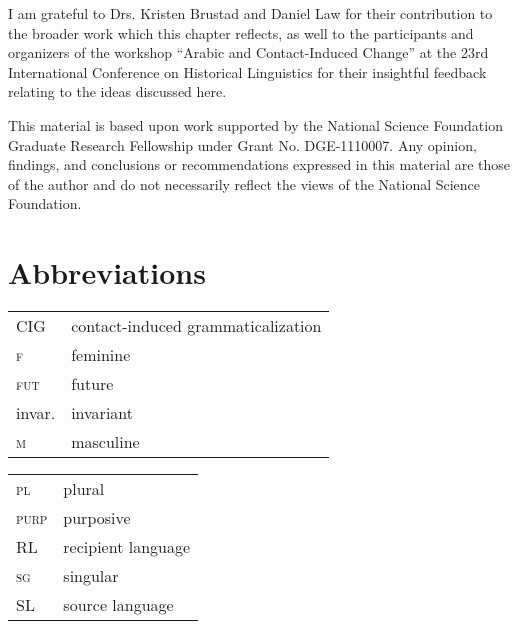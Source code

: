 \documentclass[output=paper]{langsci/langscibook}
\begin{document}
I am grateful to Drs. Kristen Brustad and Daniel Law for their contribution to the broader work which this chapter reflects, as well to the participants and organizers of the workshop “Arabic and Contact-Induced Change” at the 23rd International Conference on Historical Linguistics for their insightful feedback relating to the ideas discussed here.

This material is based upon work supported by the National Science Foundation Graduate Research Fellowship under Grant No. DGE-1110007. Any opinion, findings, and conclusions or recommendations expressed in this material are those of the author and do not necessarily reflect the views of the National Science Foundation.

\section*{Abbreviations}
\begin{tabularx}{.6\textwidth}{@{}lQ@{}}
CIG & contact-induced grammaticalization \\
\textsc{f} & feminine \\
\textsc{fut} & future \\
invar. & invariant \\
\textsc{m} & masculine \\
\end{tabularx}%
\begin{tabularx}{.5\textwidth}{@{}lQ@{}}
\textsc{pl} & plural \\
\textsc{purp} & purposive \\
RL & recipient language \\
\textsc{sg} & singular \\
SL & source language \\
\end{tabularx}%

\sloppy
\printbibliography[heading=subbibliography,notkeyword=this] 
\end{document}
